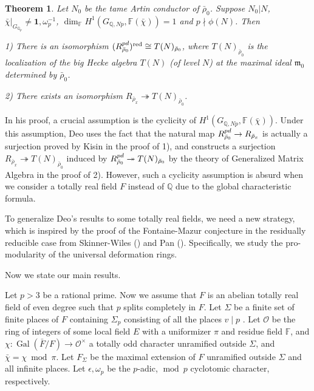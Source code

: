 \documentclass[12pt]{amsart}
\theoremstyle{plain}
\newtheorem{thm}{Theorem}[subsection]
\theoremstyle{definition}
\theoremstyle{remark}
\begin{document}

\begin{thm}{\cite[Theorem A, Theorem 4.5]{deo2023density}}
	Let $N_0$ be the tame Artin conductor of $\bar{\rho}_0$. Suppose $N_0|N$, $\bar{\chi}|_{G_{\mathbb{Q}_p}} \ne \mathbf{1}, \omega_p^{-1}$, $\operatorname{dim}_{\mathbb{F}} H^1(G_{\mathbb{Q}, Np}, \mathbb{F}(\bar{\chi}))=1$ and $p \nmid \phi(N)$. Then
	
	1) There is an isomorphism $ (R_{\bar{\rho}_0}^{\textnormal{pd}})^{\operatorname{red}} \cong T(N)_{\bar{\rho}_0}$, where $T(N)_{\bar{\rho}_0}$ is the localization of the big Hecke algebra $T(N)$ (of level $N$) at the maximal ideal $\mathfrak{m}_0$ determined by $\bar{\rho}_0$.
	
	2) There exists an isomorphism $ R_{\bar{\rho}_x} \twoheadrightarrow T(N)_{\bar{\rho}_0}$.
\end{thm} 
 
In his proof, a crucial assumption is the cyclicity of $H^1(G_{\mathbb{Q}, Np}, \mathbb{F}(\bar{\chi}))$. Under this assumption, Deo uses the fact that the natural map $R_{\bar{\rho}_0}^{\textnormal{pd}} \to R_{\bar{\rho}_x} $ is actually a surjection proved by Kisin \cite[Corollary 1.4.4]{kisin2009fontaine} in the proof of 1), and constructs a surjection $R_{\bar{\rho}_x} \twoheadrightarrow T(N)_{\bar{\rho}_0} $ induced by $R_{\bar{\rho}_0}^{\textnormal{pd}} \twoheadrightarrow T(N)_{\bar{\rho}_0}$ by the theory of Generalized Matrix Algebra in the proof of 2). However, such a cyclicity assumption is absurd when we consider a totally real field $F$ instead of $\mathbb{Q}$ due to the global characteristic formula.

To generalize Deo's results to some totally real fields, we need a new strategy, which is inspired by the proof of the Fontaine-Mazur conjecture in the residually reducible case from Skinner-Wiles (\cite{skinner1999residually}) and Pan (\cite{pan2022fontaine}).
Specifically, we study the pro-modularity of the universal deformation rings.

Now we state our main results.

 Let $p>3$ be a rational prime. Now we assume that $F$ is an abelian totally real field of even degree such that $p$ splits completely in $F$. Let $\Sigma$ be a finite set of finite places of $F$ containing $\Sigma_p $ consisting of all the places $v \mid p$ . Let $\mathcal{O}$ be the ring of integers of some local field $E$ with a uniformizer $\pi$ and residue field $\mathbb{F}$, and $\chi: \operatorname{Gal}(\bar{F}/F) \to \mathcal{O}^\times$ a totally odd character unramified outside $\Sigma$, and $\bar{\chi}=\chi ~\operatorname{mod} ~\pi$. Let $F_{\Sigma}$ be the maximal extension of $F$ unramified outside $\Sigma$ and all infinite places. Let $\epsilon, \omega_p$ be the $p$-adic, $\operatorname{mod}~p$ cyclotomic character, respectively.
 
\end{document}
